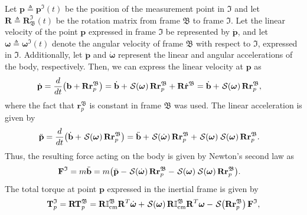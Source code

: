 Let $\mathbf{p}\triangleq\mathbf{p}^\mathfrak{I}(t)$ be the position of the measurement point in $\mathfrak{I}$ and let $\mathbf{R}\triangleq \mathbf{R}_\mathfrak{B}^\mathfrak{I}(t)$ be the rotation matrix from frame $\mathfrak{B}$ to frame $\mathfrak{I}$. Let the linear velocity of the point $\mathbf{p}$ expressed in frame $\mathfrak{I}$ be represented by $\dot{\mathbf{p}}$, and let $\boldsymbol{\omega}\triangleq\boldsymbol{\omega}^\mathfrak{I}(t)$ denote the angular velocity of frame $\mathfrak{B}$ with respect to $\mathfrak{I}$, expressed in $\mathfrak{I}$. Additionally, let $\ddot{\mathbf{p}}$ and $\dot{\boldsymbol{\omega}}$ represent the linear and angular accelerations of the body, respectively. Then, we can express the linear velocity at $\mathbf{p}$ as
\begin{align}
    \dot{\mathbf{p}} &= \frac{d}{dt}\bigl(\mathbf{b} + \mathbf{R}\mathbf{r}^\mathfrak{B}_p\bigr) 
    = \dot{\mathbf{b}} +\SL[\boldsymbol{\omega}]\mathbf{R}\mathbf{r}^\mathfrak{B}_p + \mathbf{R}\dot{\mathbf{r}}^\mathfrak{B} = \dot{\mathbf{b}} +\SL[\boldsymbol{\omega}]\mathbf{R}\mathbf{r}^\mathfrak{B}_p,
\end{align}
where the fact that $\mathbf{r}^\mathfrak{B}_p$ is constant in frame $\mathfrak{B}$ was used. The linear acceleration is given by
\begin{align}
    \ddot{\mathbf{p}} &= \frac{d}{dt}\bigl(\dot{\mathbf{b}} +\SL[\boldsymbol{\omega}]\mathbf{R}\mathbf{r}^\mathfrak{B}_p\bigr) 
    = \ddot{\mathbf{b}} + \SL[\dot{\boldsymbol{\omega}}]\mathbf{R}\mathbf{r}^\mathfrak{B}_p + \SL[\boldsymbol{\omega}]\SL[\boldsymbol{\omega}]\mathbf{R}\mathbf{r}^\mathfrak{B}_p.
\end{align}
Thus, the resulting force acting on the body is given by Newton's second law as
\begin{align}
    \mathbf{F}^\mathfrak{I}&=m\ddot{\mathbf{b}} = m\bigl(\ddot{\mathbf{p}} - \SL[\dot{\boldsymbol{\omega}}]\mathbf{R}\mathbf{r}^\mathfrak{B}_p - \SL[\boldsymbol{\omega}]\SL[\boldsymbol{\omega}]\mathbf{R}\mathbf{r}^\mathfrak{B}_p\bigr).
\end{align}
The total torque at point $\mathbf{p}$ expressed in the inertial frame is given by
\begin{align}
    \mathbf{T}^\mathfrak{I}_p = \mathbf{R}\mathbf{T}^\mathfrak{B}_p = \mathbf{R}\mathbb{I}^\mathfrak{B}_\text{cm}\mathbf{R}^T\dot{\boldsymbol{\omega}} + \SL[\boldsymbol{\omega}]\mathbf{R}\mathbb{I}^\mathfrak{B}_\text{cm}\mathbf{R}^T\boldsymbol{\omega} - \SL[\mathbf{R}\mathbf{r}^\mathfrak{B}_p]\mathbf{F}^\mathfrak{I}, \label{eq:torque-modelling}
\end{align}
